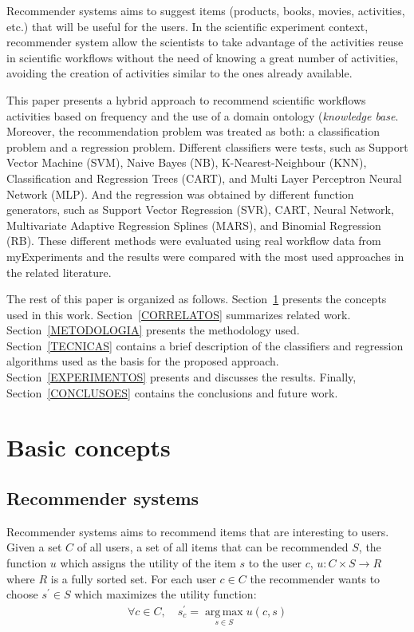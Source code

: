 \documentclass{sig-alternate-05-2015}
\begin{document}
Recommender systems aims to suggest items (products, books, movies, activities, etc.) that will be useful for the users. In the scientific experiment context, recommender system allow the scientists to take advantage of the activities reuse in scientific workflows without the need of knowing a great number of activities, avoiding the creation of activities similar to the ones already available.

This paper presents a hybrid approach to recommend scientific workflows activities based on frequency and the use of a domain ontology (\emph{knowledge base}. Moreover, the recommendation problem was treated as both: a classification problem and a regression problem. Different classifiers were tests, such as Support Vector Machine (SVM), Naive Bayes (NB), K-Nearest-Neighbour (KNN), Classification and Regression Trees (CART), and Multi Layer Perceptron Neural Network (MLP). And the regression was obtained by different function generators, such as Support Vector Regression (SVR), CART, Neural Network, Multivariate Adaptive Regression Splines (MARS), and Binomial Regression (RB). These different methods were evaluated using real workflow data from myExperiments and the results were compared with the most used approaches in the related literature.

The rest of this paper is organized as follows. Section~\ref{basicconcepts} presents the concepts used in this work. Section~\ref{CORRELATOS} summarizes related work. Section~\ref{METODOLOGIA} presents the methodology used. Section~\ref{TECNICAS} contains a brief description of the classifiers and regression algorithms used as the basis for the proposed approach. Section~\ref{EXPERIMENTOS} presents and discusses the results. Finally, Section~\ref{CONCLUSOES} contains the conclusions and future work.


\section{Basic concepts}\label{basicconcepts}

\subsection{Recommender systems}\label{SISTEMASRECOMENDACAO}
Recommender systems aims to recommend items that are interesting to users. Given a set \(C\) of all users, a set of all items that can be recommended \(S\), the function \(u\) which assigns the utility of the item \(s\) to the user \(c\), \(u:C \times S\rightarrow R\) where \(R\) is a fully sorted set. For each user \(c \in C \) the recommender wants to choose \(s^{'} \in S \) which maximizes the utility function:
\begin{align}
\forall c \in C,  \quad s_{c}^{'} =  \operatorname*{arg\,max}_{s \in S} u(c,s) \label{formalizar_recomendacao}
\end{align}
\end{document}
